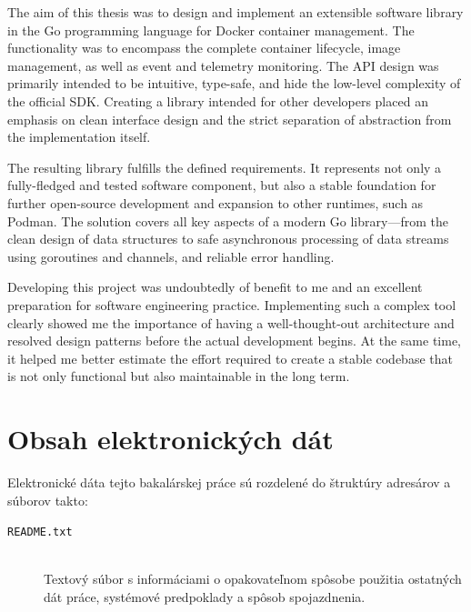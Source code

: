 \documentclass[
 program=infpvs,
  language=slovak,
  figures=false,
  tables=false,
  sourcecodes,
  glossaries,
  index
]{kidiplom}
\begin{document}
{\begin{kiconclusions}[english]
The aim of this thesis was to design and implement an extensible software library in the Go programming language for Docker container management. The functionality was to encompass the complete container lifecycle, image management, as well as event and telemetry monitoring. The API design was primarily intended to be intuitive, type-safe, and hide the low-level complexity of the official SDK. Creating a library intended for other developers placed an emphasis on clean interface design and the strict separation of abstraction from the implementation itself.

The resulting library fulfills the defined requirements. It represents not only a fully-fledged and tested software component, but also a stable foundation for further open-source development and expansion to other runtimes, such as Podman. The solution covers all key aspects of a modern Go library—from the clean design of data structures to safe asynchronous processing of data streams using goroutines and channels, and reliable error handling.

Developing this project was undoubtedly of benefit to me and an excellent preparation for software engineering practice. Implementing such a complex tool clearly showed me the importance of having a well-thought-out architecture and resolved design patterns before the actual development begins. At the same time, it helped me better estimate the effort required to create a stable codebase that is not only functional but also maintainable in the long term.
\end{kiconclusions}

\clearpage
\appendix

\section{Obsah elektronických dát} \label{sec:ObsahData}
Elektronické dáta tejto bakalárskej práce sú rozdelené do štruktúry adresárov a súborov takto:

\begin{description}

\item[\texttt{README.txt}] \hfill \\
  Textový súbor s informáciami o opakovateľnom spôsobe použitia ostatných
  dát práce, systémové predpoklady a spôsob spojazdnenia.


\end{description}}
\end{document}
